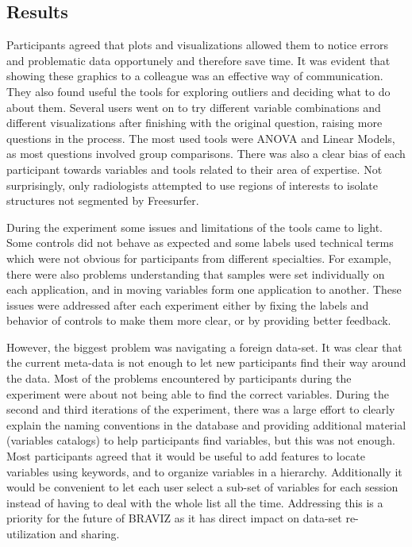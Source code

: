 \subsection{Results}
\label{sec_ana_results}

Participants agreed that plots and visualizations allowed them to notice errors and problematic data opportunely and therefore save time. It was evident that showing these graphics to a colleague was an effective way of communication. They also found useful the tools for exploring outliers and deciding what to do about them. Several users went on to try different variable combinations and different visualizations after finishing with the original question, raising more questions in the process. The most used tools were ANOVA and Linear Models, as most questions involved group comparisons. There was also a clear bias of each participant towards variables and tools related to their area of expertise. Not surprisingly, only radiologists attempted to use regions of interests to isolate structures not segmented by Freesurfer. 

During the experiment some issues and limitations of the tools came to light. Some controls did not behave as expected and some labels used technical terms which were not obvious for participants from different specialties. For example, there were also problems understanding that samples were set individually on each application, and in moving variables form one application to another. These issues were addressed after each experiment either by fixing the labels and behavior of controls to make them more clear, or by providing better feedback. 

However, the biggest problem was navigating a foreign data-set. It was clear that the current meta-data is not enough to let new participants find their way around the data. Most of the problems encountered by participants during the experiment were about not being able to find the correct variables. During the second and third iterations of the experiment, there was a large effort to clearly explain the naming conventions in the database and providing additional material (variables catalogs) to help participants find variables, but this was not enough. Most participants agreed that it would be useful to add features to locate variables using keywords, and to organize variables in a hierarchy. Additionally it would be convenient to let each user select a sub-set of variables for each session instead of having to deal with the whole list all the time. Addressing this is a priority for the future of BRAVIZ as it has direct impact on data-set re-utilization and sharing.



